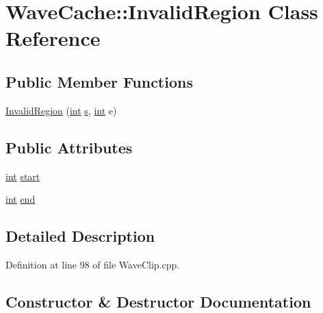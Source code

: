 \hypertarget{class_wave_cache_1_1_invalid_region}{}\section{Wave\+Cache\+:\+:Invalid\+Region Class Reference}
\label{class_wave_cache_1_1_invalid_region}
\subsection*{Public Member Functions}
\begin{DoxyCompactItemize}
\item 
\hyperlink{class_wave_cache_1_1_invalid_region_a3ba710f3c6ad801c82f62cbdc7ed2e53}{Invalid\+Region} (\hyperlink{xmltok_8h_a5a0d4a5641ce434f1d23533f2b2e6653}{int} \hyperlink{lib_2expat_8h_a755339d27872b13735c2cab829e47157}{s}, \hyperlink{xmltok_8h_a5a0d4a5641ce434f1d23533f2b2e6653}{int} e)
\end{DoxyCompactItemize}
\subsection*{Public Attributes}
\begin{DoxyCompactItemize}
\item 
\hyperlink{xmltok_8h_a5a0d4a5641ce434f1d23533f2b2e6653}{int} \hyperlink{class_wave_cache_1_1_invalid_region_a4ca9097f9898a2ce46872fcdc113d19a}{start}
\item 
\hyperlink{xmltok_8h_a5a0d4a5641ce434f1d23533f2b2e6653}{int} \hyperlink{class_wave_cache_1_1_invalid_region_ab22e9d12b5319685c6de8adaae80145d}{end}
\end{DoxyCompactItemize}


\subsection{Detailed Description}


Definition at line 98 of file Wave\+Clip.\+cpp.



\subsection{Constructor \& Destructor Documentation}

